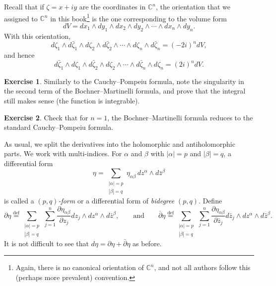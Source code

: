 \documentclass[12pt,openany]{book}
\newcommand{\abs}[1]{\left\lvert {#1} \right\rvert}
\newcommand{\C}{{\mathbb{C}}}
\newcommand{\myindex}[1]{#1\index{#1}}
\theoremstyle{plain}
\theoremstyle{remark}
\theoremstyle{definition}
\newenvironment{exbox}{%
    \def\FrameCommand{\vrule width 1pt \relax\hspace{10pt}}%
    \MakeFramed{\advance\hsize-\width\FrameRestore}%
}{%
    \endMakeFramed
}
\theoremstyle{exercise}
\newtheorem{exercise}{Exercise}[section]
\theoremstyle{example}
\begin{document}
Recall that if $\zeta = x+iy$ are the coordinates in $\C^n$, the orientation that we assigned to $\C^n$ in
this book\footnote{Again, there is
no canonical orientation of $\C^n$, and
not all authors follow this (perhaps more prevalent) convention.}
is the one corresponding to the volume form
%
\begin{equation*}
dV = dx_1 \wedge dy_1 \wedge dx_2 \wedge dy_2 \wedge \cdots \wedge dx_n \wedge dy_n .
\end{equation*}
With this orientation,
\begin{equation*}
d\zeta_1 \wedge d\bar{\zeta}_1 \wedge
d\zeta_2 \wedge d\bar{\zeta}_2 \wedge
\cdots \wedge
d\zeta_n \wedge d\bar{\zeta}_n = {(-2i)}^n dV ,
\end{equation*}
and hence
\begin{equation*}
d\bar{\zeta}_1 \wedge d\zeta_1 \wedge
d\bar{\zeta}_2 \wedge d\zeta_2 \wedge
\cdots \wedge
d\bar{\zeta}_n \wedge d\zeta_n = {(2i)}^n dV .
\end{equation*}

\begin{exbox}
\begin{exercise}
Similarly to the Cauchy--Pompeiu formula,
note the singularity in the second term of the Bochner--Martinelli formula,
and prove that the integral still makes
sense (the function is integrable).
\end{exercise}

\begin{exercise}
Check that for $n=1$, the Bochner--Martinelli formula
reduces to the standard Cauchy--Pompeiu formula.
\end{exercise}
\end{exbox}

As usual, we split the derivatives into the holomorphic and
antiholomorphic parts.  We work with multi-indices.  For $\alpha$ and $\beta$
with $\abs{\alpha}=p$ and 
$\abs{\beta}=q$, a differential form
\begin{equation*}
\eta = 
\sum_{\substack{\abs{\alpha}=p \\ \abs{\beta}=q}}
\eta_{\alpha \beta} \, dz^\alpha \wedge d\bar{z}^\beta 
\end{equation*}
is called a \emph{\myindex{$(p,q)$-form}} or a differential form of
\emph{\myindex{bidegree}} $(p,q)$.
Define
%
%
\begin{equation*}
\partial \eta \overset{\text{def}}{=}
\sum_{\substack{\abs{\alpha}=p \\ \abs{\beta}=q}}
\,
\sum_{j=1}^n
\frac{\partial \eta_{\alpha \beta}}{\partial z_j} dz_j \wedge dz^\alpha
\wedge d\bar{z}^\beta ,
\qquad \text{and} \qquad
\bar{\partial} \eta \overset{\text{def}}{=}
\sum_{\substack{\abs{\alpha}=p \\ \abs{\beta}=q}}
\,
\sum_{j=1}^n
\frac{\partial \eta_{\alpha \beta}}{\partial \bar{z}_j} d\bar{z}_j \wedge dz^\alpha
\wedge d\bar{z}^\beta .
\end{equation*}
It is not difficult to see that $d \eta = \partial \eta +
\bar{\partial} \eta$ as before.
\end{document}
